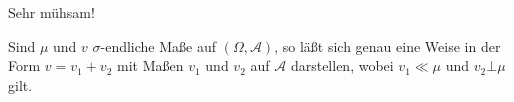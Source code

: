 \documentclass[/Users/zhangwusheng/Documents/satz von radon nikodym/satz von radon nikodym.tex]{subfiles}
\begin{document}
    Sehr mühsam!
    \begin{theorem}\label{satz:7}
        Sind $\mu$ und $v$ $\sigma$-endliche Maße auf $(\Omega, \mathcal{A})$, so läßt sich genau eine Weise in der Form 
        $v = v_1 + v_2$ mit Maßen $v_1$ und $v_2$ auf $\mathcal{A}$ darstellen, wobei $v_1 \ll \mu$ und $v_2 \bot \mu$ gilt.
      \end{theorem}      
\end{document}
